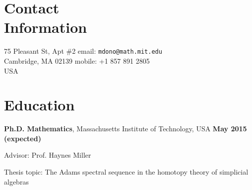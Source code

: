 \documentclass[margin,line]{resume}
\begin{document}
\begin{resume}

\vspace{4mm}
    \section{\mysidestyle Contact\\Information}

    75 Pleasant St, Apt \#2                 \hfill email: \texttt{mdono@math.mit.edu}                 
\vspace{0mm}\\\vspace{0mm}%
    Cambridge, MA  02139                    \hfill mobile: +1 857 891 2805 \vspace{0mm}\\\hspace{-1mm} 				
    USA                                  





    \section{\mysidestyle Education}

 \textbf{Ph.D. Mathematics}, Massachusetts Institute of Technology, USA
\hfill \textbf{May 2015  (expected)}\\%

\vspace{-3mm}
    \begin{list2}
        \item Advisor: Prof. Haynes Miller
        \item Thesis topic: The Adams spectral sequence in the homotopy theory of simplicial algebras
    \end{list2}
    

\end{resume}
\end{document}
